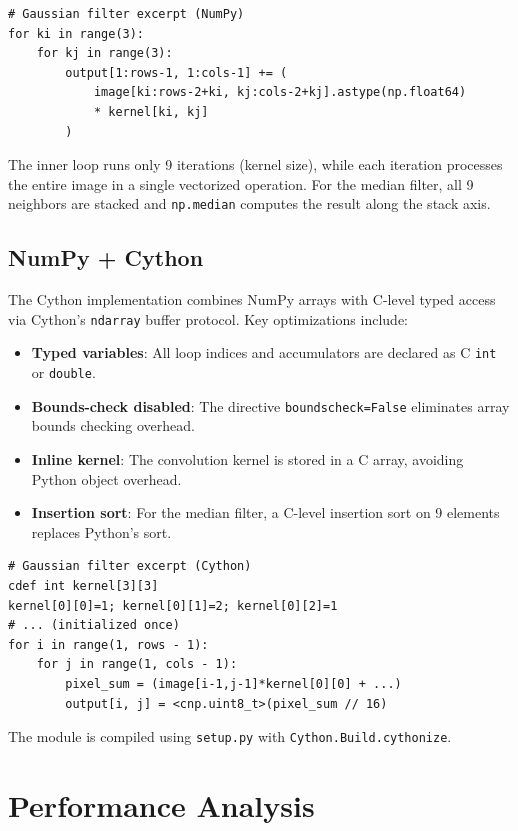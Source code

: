 \documentclass[12pt, a4paper]{article}
\begin{document}
\begin{lstlisting}
# Gaussian filter excerpt (NumPy)
for ki in range(3):
    for kj in range(3):
        output[1:rows-1, 1:cols-1] += (
            image[ki:rows-2+ki, kj:cols-2+kj].astype(np.float64)
            * kernel[ki, kj]
        )
\end{lstlisting}

The inner loop runs only 9 iterations (kernel size), while each iteration processes the entire image in a single vectorized operation. For the median filter, all 9 neighbors are stacked and \texttt{np.median} computes the result along the stack axis.

\subsection{NumPy + Cython}

The Cython implementation combines NumPy arrays with C-level typed access via Cython's \texttt{ndarray} buffer protocol. Key optimizations include:

\begin{itemize}
    \item \textbf{Typed variables}: All loop indices and accumulators are declared as C \texttt{int} or \texttt{double}.
    \item \textbf{Bounds-check disabled}: The directive \texttt{boundscheck=False} eliminates array bounds checking overhead.
    \item \textbf{Inline kernel}: The convolution kernel is stored in a C array, avoiding Python object overhead.
    \item \textbf{Insertion sort}: For the median filter, a C-level insertion sort on 9 elements replaces Python's sort.
\end{itemize}

\begin{lstlisting}
# Gaussian filter excerpt (Cython)
cdef int kernel[3][3]
kernel[0][0]=1; kernel[0][1]=2; kernel[0][2]=1
# ... (initialized once)
for i in range(1, rows - 1):
    for j in range(1, cols - 1):
        pixel_sum = (image[i-1,j-1]*kernel[0][0] + ...)
        output[i, j] = <cnp.uint8_t>(pixel_sum // 16)
\end{lstlisting}

The module is compiled using \texttt{setup.py} with \texttt{Cython.Build.cythonize}.

\section{Performance Analysis}
\end{document}
